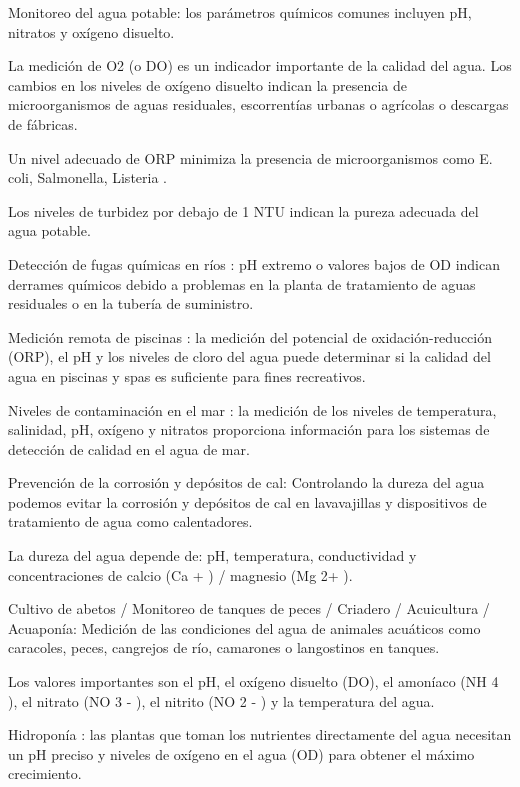 
Monitoreo del agua potable: los parámetros químicos comunes incluyen pH, nitratos y oxígeno disuelto. 

La medición de O2 (o DO) es un indicador importante de la calidad del agua. 
Los cambios en los niveles de oxígeno disuelto indican la presencia de microorganismos de aguas residuales, escorrentías urbanas o agrícolas o descargas de fábricas. 

Un nivel adecuado de ORP minimiza la presencia de microorganismos como  E. coli, Salmonella, Listeria . 

Los niveles de turbidez por debajo de 1 NTU indican la pureza adecuada del agua potable.

Detección de fugas químicas en ríos : pH extremo o valores bajos de OD indican derrames químicos debido a problemas en la planta de tratamiento de aguas residuales o en la tubería de suministro.

Medición remota de piscinas : la medición del potencial de oxidación-reducción (ORP), el pH y los niveles de cloro del agua puede determinar si la calidad del agua en piscinas y spas es suficiente para fines recreativos.

Niveles de contaminación en el mar : la medición de los niveles de temperatura, salinidad, pH, oxígeno y nitratos proporciona información para los sistemas de detección de calidad en el agua de mar.

Prevención de la corrosión y depósitos de cal:  Controlando la dureza del agua podemos evitar la corrosión y depósitos de cal en lavavajillas y dispositivos de tratamiento de agua como calentadores. 

La dureza del agua depende de: pH, temperatura, conductividad y concentraciones de calcio (Ca + ) / magnesio (Mg 2+ ).

Cultivo de abetos / Monitoreo de tanques de peces / Criadero / Acuicultura / Acuaponía: Medición de las condiciones del agua de animales acuáticos como caracoles, peces, cangrejos de río, camarones o langostinos en tanques. 

Los valores importantes son el pH, el oxígeno disuelto (DO), el amoníaco (NH 4 ), el nitrato (NO 3 - ), el nitrito (NO 2 - ) y la temperatura del agua.

Hidroponía : las plantas que toman los nutrientes directamente del agua necesitan un pH preciso y niveles de oxígeno en el agua (OD) para obtener el máximo crecimiento.

